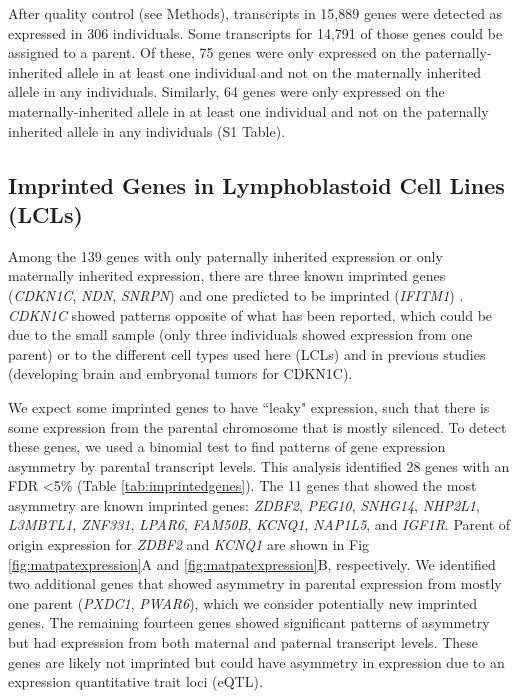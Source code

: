 After quality control (see Methods), transcripts in 15,889 genes were detected as expressed in 306 individuals. Some transcripts for 14,791 of those genes could be assigned to a parent. Of these, 75 genes were only expressed on the paternally-inherited allele in at least one individual and not on the maternally inherited allele in any individuals. Similarly, 64 genes were only expressed on the maternally-inherited allele in at least one individual and not on the paternally inherited allele in any individuals (S1 Table).

\subsection{Imprinted Genes in Lymphoblastoid Cell Lines (LCLs)}\label{Imprinted Genes in Lymphoblastoid Cell Lines (LCLs)}
Among the 139 genes with only paternally inherited expression or only maternally inherited expression, there are three known imprinted genes (\emph{CDKN1C}, \emph{NDN}, \emph{SNRPN}) and one predicted to be imprinted (\emph{IFITM1}) \cite{Luedi:2007ib}. \emph{CDKN1C} showed patterns opposite of what has been reported\cite{Hatada:1995jf,Matsuoka:1996uq}, which could be due to the small sample (only three individuals showed expression from one parent) or to the different cell types used here (LCLs) and in previous studies (developing brain and embryonal tumors for CDKN1C).

We expect some imprinted genes to have ``leaky" expression, such that there is some expression from the parental chromosome that is mostly silenced. To detect these genes, we used a binomial test to find patterns of gene expression asymmetry by parental transcript levels.  This analysis identified 28 genes with an FDR \textless5\% (Table \ref{tab:imprintedgenes}). The 11 genes that showed the most asymmetry are known imprinted genes: \emph{ZDBF2}, \emph{PEG10}, \emph{SNHG14}, \emph{NHP2L1}, \emph{L3MBTL1}, \emph{ZNF331}, \emph{LPAR6}, \emph{FAM50B}, \emph{KCNQ1}, \emph{NAP1L5}, and \emph{IGF1R}. Parent of origin expression for \emph{ZDBF2} and \emph{KCNQ1} are shown in Fig \ref{fig:matpatexpression}A and \ref{fig:matpatexpression}B, respectively. We identified two additional genes that showed asymmetry in parental expression from mostly one parent (\emph{PXDC1}, \emph{PWAR6}), which we consider potentially new imprinted genes. The remaining fourteen genes showed significant patterns of asymmetry but had expression from both maternal and paternal transcript levels. These genes are likely not imprinted but could have asymmetry in expression due to an expression quantitative trait loci (eQTL). 



